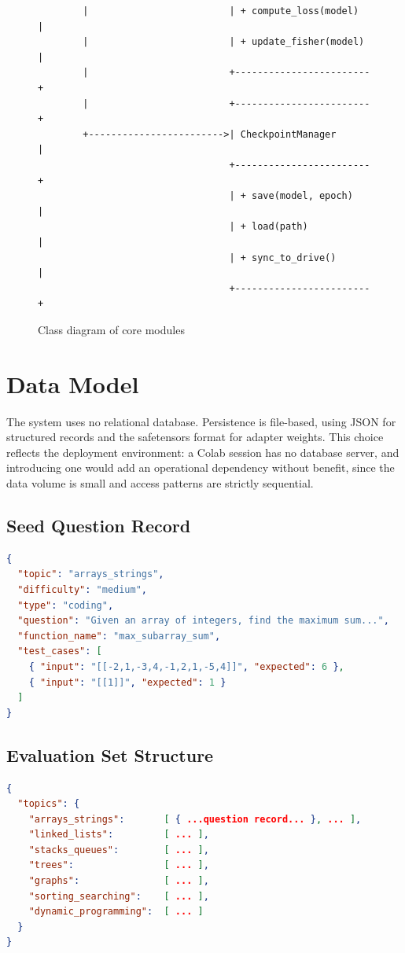 \documentclass[12pt,a4paper]{report}
\begin{document}
\begin{figure}[htbp]
\begin{verbatim}
        |                         | + compute_loss(model)  |
        |                         | + update_fisher(model) |
        |                         +------------------------+
        |                         +------------------------+
        +------------------------>| CheckpointManager      |
                                  +------------------------+
                                  | + save(model, epoch)   |
                                  | + load(path)           |
                                  | + sync_to_drive()      |
                                  +------------------------+
\end{verbatim}
\caption{Class diagram of core modules}
\end{figure}

\section{Data Model}

The system uses no relational database. Persistence is file-based, using JSON for structured records and the safetensors format for adapter weights. This choice reflects the deployment environment: a Colab session has no database server, and introducing one would add an operational dependency without benefit, since the data volume is small and access patterns are strictly sequential.

\subsection{Seed Question Record}

\begin{lstlisting}[language=json]
{
  "topic": "arrays_strings",
  "difficulty": "medium",
  "type": "coding",
  "question": "Given an array of integers, find the maximum sum...",
  "function_name": "max_subarray_sum",
  "test_cases": [
    { "input": "[[-2,1,-3,4,-1,2,1,-5,4]]", "expected": 6 },
    { "input": "[[1]]", "expected": 1 }
  ]
}
\end{lstlisting}

\subsection{Evaluation Set Structure}

\begin{lstlisting}[language=json]
{
  "topics": {
    "arrays_strings":       [ { ...question record... }, ... ],
    "linked_lists":         [ ... ],
    "stacks_queues":        [ ... ],
    "trees":                [ ... ],
    "graphs":               [ ... ],
    "sorting_searching":    [ ... ],
    "dynamic_programming":  [ ... ]
  }
}
\end{lstlisting}
\end{document}
